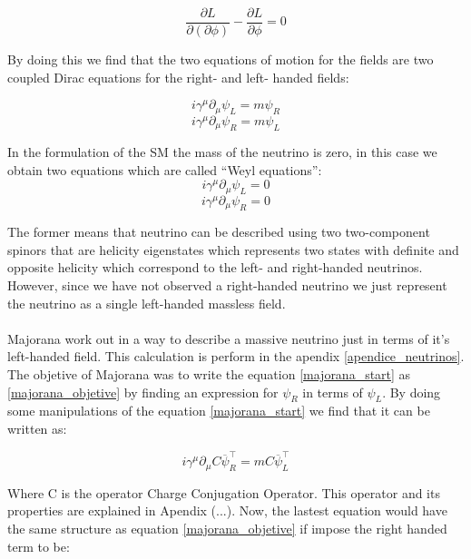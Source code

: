 \begin{equation}
\frac{\partial L}{\partial (\partial \phi)} - \frac{\partial L}{\partial \phi} = 0
\end{equation}

By doing this we find that the two equations of motion for the fields are two coupled Dirac equations for the right- and left- handed fields:

\begin{equation}\label{majorana_objetive}
i \gamma ^\mu \partial_\mu \psi_L = m \psi_R
\end{equation} 
\begin{equation}\label{majorana_start}
i \gamma ^\mu \partial_\mu \psi_R = m \psi_L
\end{equation} 

In the formulation of the SM the mass of the neutrino is zero, in this case we obtain two equations which are called ``Weyl equations'':
\begin{equation}
i \gamma ^\mu \partial_\mu \psi_L = 0
\end{equation}
\begin{equation}
i \gamma ^\mu \partial_\mu \psi_R = 0
\end{equation}

The former means that neutrino can be described using two two-component spinors that are helicity eigenstates which represents two states 
with definite and opposite helicity which correspond to the left- and right-handed neutrinos. However, since we have not observed a right-handed neutrino 
we just represent the neutrino as a single left-handed massless field.  \\
\\
Majorana work out in a way to describe a massive neutrino just in terms of it's left-handed field.
This calculation is perform in the apendix \ref{apendice_neutrinos}. The objetive of Majorana was to write the equation
\ref{majorana_start} as \ref{majorana_objetive} by finding an expression for $\psi_R$ in terms of $\psi_L$. By doing some manipulations of the equation \ref{majorana_start} we 
find that it can be written as:  

\begin{equation}
i \gamma^\mu \partial_\mu C \overline{\psi}^\intercal_R = m C \overline{\psi}^{\intercal}_L
\end{equation}

Where C is the operator Charge Conjugation Operator. This operator and its properties are explained in Apendix (...). Now, the lastest equation would have the same structure
as equation \ref{majorana_objetive} if impose the right handed term to be:

